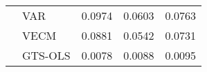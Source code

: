 \begin{table}[!h]
\begin{tabular}{llccc}
                                  & \multicolumn{1}{l}{VAR}                     &   0.0974  & 0.0603  & 0.0763 \\
                                  & \multicolumn{1}{l}{VECM}                    &   0.0881  & 0.0542  & 0.0731 \\
                                  & \multicolumn{1}{l}{GTS-OLS}                 &   0.0078  & 0.0088  & 0.0095 \\    
    \bottomrule
  \end{tabular}
  \label{table:GTS-OLS fit}
  \vspace{1em}  
\end{table}
